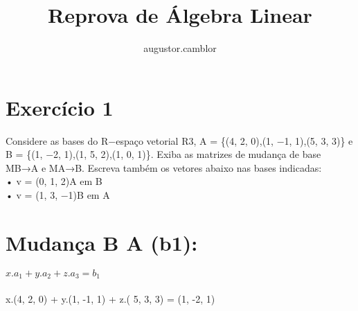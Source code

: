 \documentclass{article}
\title{Reprova de Álgebra Linear}
\author{augustor.camblor }
\begin{document}
\maketitle
\section{Exercício 1}\label{ex1}
Considere as bases do R−espaço vetorial R3, A = \{(4, 2, 0),(1, −1, 1),(5, 3, 3)\}  e
B = \{(1, −2, 1),(1, 5, 2),(1, 0, 1)\}. Exiba as matrizes de mudança de base MB→A e MA→B. Escreva também os
vetores abaixo nas bases indicadas:
\\• v = (0, 1, 2)A em B
\\• v = (1, 3, −1)B em A\\
\section{Mudança B \rightarrow A (b1):}
\textbf{$x. a_1 + y. a_2 + z. a_3 = b_1 $\\\\}
x.(4, 2, 0) + y.(1, -1, 1) + z.( 5, 3, 3) = (1, -2, 1) \\\\
\end{document}

